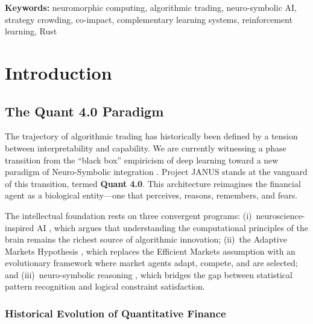 \documentclass[12pt, a4paper]{article}
\begin{document}
\vspace{0.5cm}
\noindent\textbf{Keywords:} neuromorphic computing, algorithmic trading, neuro-symbolic AI, strategy crowding, co-impact, complementary learning systems, reinforcement learning, Rust

\newpage
\tableofcontents
\newpage

\section{Introduction}
\label{sec:introduction}

\subsection{The Quant 4.0 Paradigm}
\label{sec:quant4}

The trajectory of algorithmic trading has historically been defined by a tension between interpretability and capability.
We are currently witnessing a phase transition from the ``black box'' empiricism of deep learning \citep{lecun2015deep} toward a new paradigm of Neuro-Symbolic integration \citep{marra2024neurosymbolic, garcez2023neurosymbolic}.
Project JANUS stands at the vanguard of this transition, termed \textbf{Quant 4.0}.
This architecture reimagines the financial agent as a biological entity---one that perceives, reasons, remembers, and fears.

The intellectual foundation rests on three convergent programs:
(i)~neuroscience-inspired AI \citep{hassabis2017neuroscience}, which argues that understanding the computational principles of the brain remains the richest source of algorithmic innovation;
(ii)~the Adaptive Markets Hypothesis \citep{lo2004adaptive, lo2017adaptive}, which replaces the Efficient Markets assumption with an evolutionary framework where market agents adapt, compete, and are selected; and
(iii)~neuro-symbolic reasoning \citep{garcez2023neurosymbolic, badreddine2022logic}, which bridges the gap between statistical pattern recognition and logical constraint satisfaction.

\subsubsection*{Historical Evolution of Quantitative Finance}
\end{document}
